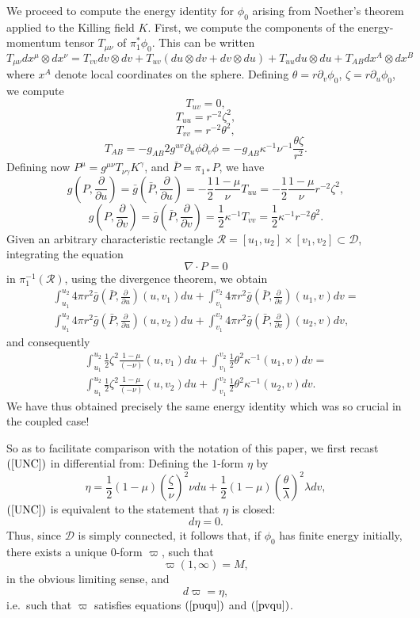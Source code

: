 \documentclass{article}
\newcommand{\tl}{\frac{\theta}{\lambda}}
\newcommand{\zn}{\frac{\zeta}{\nu}}
\begin{document}
We proceed to compute the energy identity for $\phi_0$
arising from Noether's theorem applied to the Killing field $K$.
First, we compute the components of the energy-momentum tensor
$T_{\mu\nu}$ of $\pi_1^*\phi_0$. This can be written
\[
T_{\mu\nu}dx^\mu\otimes dx^\nu=T_{vv}dv\otimes dv+T_{uv}(du\otimes dv+dv\otimes du)
+T_{uu}du\otimes du+T_{AB}dx^A\otimes dx^B
\]
where $x^A$ denote local coordinates on the sphere.
Defining
$\theta=r\partial_v\phi_0$, $\zeta=r\partial_u\phi_0$,
we compute
\[
T_{uv}=0,
\]
\[
T_{uu}=r^{-2}\zeta^2,
\]
\[
T_{vv}=r^{-2}\theta^2,
\]
\[
T_{AB}=-g_{AB}2g^{uv}\partial_u\phi\partial_v\phi=
-g_{AB}\kappa^{-1}\nu^{-1}\frac{\theta\zeta}{r^2}.
\]
Defining now
$P^\mu=g^{\mu\nu}T_{\nu\gamma}K^\gamma$, and $\bar{P}=\pi_{1*} P$,
we have
\[
g\left(P,\frac\partial{\partial u}\right)=
\bar{g}\left(\bar{P},\frac\partial{\partial u}\right)=
-\frac12\frac{1-\mu}\nu T_{uu}=-\frac12\frac{1-\mu}{\nu}r^{-2}\zeta^2,
\]
\[
g\left(P,\frac\partial{\partial v}\right)=
\bar{g}\left(\bar{P},\frac\partial{\partial v}\right)=\frac12\kappa^{-1} 
T_{vv}=\frac12\kappa^{-1}r^{-2}\theta^2.
\]
Given an arbitrary characteristic rectangle $\mathcal{R}=[u_1,u_2]\times[v_1,v_2]
\subset\mathcal{D}$,
integrating the equation
\[
\nabla\cdot P=0
\]
in $\pi_1^{-1}(\mathcal{R})$,
using the divergence theorem,
we obtain 
\begin{eqnarray*}
\int_{u_1}^{u_2}{4\pi r^2\bar{g}\left(\bar{P},\frac\partial{\partial u}\right)(u,v_1)du}+
\int_{v_1}^{v_2}{4\pi r^2\bar{g}\left(\bar{P},\frac\partial{\partial v}\right)(u_1,v)dv}
=\\
\int_{u_1}^{u_2}{4\pi r^2\bar{g}\left(\bar{P},\frac\partial{\partial u}\right)(u,v_2)du}+
\int_{v_1}^{v_2}{4\pi r^2\bar{g}\left(\bar{P},\frac\partial{\partial v}\right)(u_2,v)dv},
\end{eqnarray*}
and consequently
\begin{eqnarray}
\nonumber
\label{UNC}
\int_{u_1}^{u_2}{\frac12\zeta^2\frac{1-\mu}{(-\nu)}(u,v_1)du}+
\int_{v_1}^{v_2}{\frac12\theta^2\kappa^{-1}(u_1,v)dv}
=\\
\int_{u_1}^{u_2}{\frac12\zeta^2\frac{1-\mu}{(-\nu)}(u,v_2)du}+
\int_{v_1}^{v_2}{\frac12\theta^2\kappa^{-1}(u_2,v)dv}.
\end{eqnarray}
We have thus obtained precisely the same energy identity which was
so crucial in the coupled case! 

So as to facilitate comparison with the notation of this paper,
we first recast $(\ref{UNC})$ in differential from:
Defining the $1$-form $\eta$ by
\[
\eta=\frac12(1-\mu)\left(\zn\right)^2\nu du+
\frac12(1-\mu)\left(\tl\right)^2\lambda dv,
\]
$(\ref{UNC})$ is equivalent to the statement
that $\eta$ is closed:
\[
d\eta=0.
\]
Thus, since $\mathcal{D}$ is simply connected,
it follows that, if $\phi_0$ has finite energy initially,
there exists
a unique $0$-form $\varpi$, such that
\begin{equation}
\label{vatairiazei}
\varpi(1,\infty)=M,
\end{equation}
in the obvious limiting sense,
and 
\begin{equation}
\label{akribns}
d\varpi=\eta,
\end{equation}
i.e.~such that $\varpi$ satisfies
equations $(\ref{puqu})$ and $(\ref{pvqu})$.
\end{document}
